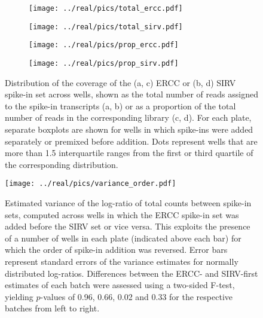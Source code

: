 \documentclass{article}
\begin{document}
\begin{figure}[btp]
    \begin{center}
        \begin{subfigure}{0.49\textwidth}
            \texttt{[image: ../real/pics/total\_ercc.pdf]}
            \caption{}
        \end{subfigure}
        \begin{subfigure}{0.49\textwidth}
            \texttt{[image: ../real/pics/total\_sirv.pdf]}
            \caption{}
        \end{subfigure}
        \begin{subfigure}{0.49\textwidth}
            \texttt{[image: ../real/pics/prop\_ercc.pdf]}
            \caption{}
        \end{subfigure}
        \begin{subfigure}{0.49\textwidth}
            \texttt{[image: ../real/pics/prop\_sirv.pdf]}
            \caption{}
        \end{subfigure}
    \end{center}
    \caption{Distribution of the coverage of the (a, c) ERCC or (b, d) SIRV spike-in set across wells, 
        shown as the total number of reads assigned to the spike-in transcripts (a, b) or as a proportion of the total number of reads in the corresponding library (c, d).
        For each plate, separate boxplots are shown for wells in which spike-ins were added separately or premixed before addition.
        Dots represent wells that are more than 1.5 interquartile ranges from the first or third quartile of the corresponding distribution.
    }
    \label{fig:totals}
\end{figure}

\begin{figure}[btp]
    \begin{center}
        \texttt{[image: ../real/pics/variance\_order.pdf]}
    \end{center}
    \caption{Estimated variance of the log-ratio of total counts between spike-in sets, computed across wells in which the ERCC spike-in set was added before the SIRV set or vice versa.
        This exploits the presence of a number of wells in each plate (indicated above each bar) for which the order of spike-in addition was reversed.
        Error bars represent standard errors of the variance estimates for normally distributed log-ratios.
        Differences between the ERCC- and SIRV-first estimates of each batch were assessed using a two-sided F-test, yielding $p$-values of 0.96, 0.66, 0.02 and 0.33 for the respective batches from left to right.
    }
\end{figure}
\end{document}
